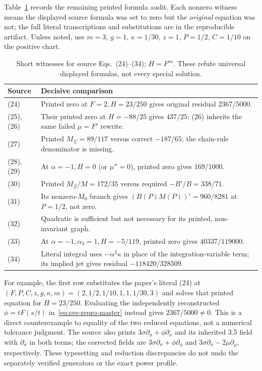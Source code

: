 Table~\ref{tab:sve-repro-source-errors} records the remaining printed
formula audit. Each nonzero witness means the displayed source formula was
set to zero but the \emph{original} equation was not; the full literal
transcriptions and substitutions are in the reproducible artifact. Unless
noted, use $m=3$, $g=1$, $\kappa=1/30$, $z=1$, $P=1/2$, $C=1/10$ on the
positive chart.
\begin{table}[ht]
\centering\small
\begin{tabularx}{\linewidth}{@{}p{1.35cm}X@{}}
\toprule
Source & Decisive comparison\\
\midrule
(24) & Printed zero at $F=2,H=23/250$ gives original residual $2367/5000$.\\
(25), (26) & Their printed zero at $H=-88/25$ gives $437/25$; (26) inherits the same failed $\mu=F'$ rewrite.\\
(27) & Printed $M_\Sigma=89/117$ versus correct $-187/65$; the chain-rule denominator is missing.\\
(28), (29) & At $\alpha=-1,H=0$ (or $\mu''=0$), printed zero gives $169/1000$.\\
(30) & Printed $M_\Xi/M=172/35$ versus required $-B'/B=338/71$.\\
(31) & Its nonzero-$M_0$ branch gives $(B(P)M(P))'=960/8281$ at $P=1/2$, not zero.\\
(32) & Quadratic is sufficient but not necessary for its printed, non-invariant graph.\\
(33) & At $\alpha=-1,\alpha_3=1,H=-5/119$, printed zero gives $40337/119000$.\\
(34) & Literal integral uses $-\alpha^2\kappa$ in place of the integration-variable term; its implied jet gives residual $-118420/328509$.\\
\bottomrule
\end{tabularx}
\caption{Short witnesses for source Eqs.~(24)--(34); $H=F'''$. These refute universal displayed formulas, not every special solution.}
\label{tab:sve-repro-source-errors}
\end{table}
For example, the first row substitutes the paper's literal (24) at
$(F,P,C,z,g,\kappa,m)=(2,1/2,1/10,1,1,1/30,3)$ and solves that
printed equation for $H=23/250$. Evaluating the independently reconstructed
$\phi=tF(s/t)$ in~\eqref{eq:sve-repro-master} instead gives
$2367/5000\ne0$. This is a direct counterexample to equality of the two
reduced equations, not a numerical tolerance judgment. The source also
prints $3\sigma\partial_\sigma+\phi\partial_\sigma$ and its inherited
3.5 field with $\partial_\sigma$ in both terms; the corrected fields are
$3\sigma\partial_\sigma+\phi\partial_\phi$ and
$3\sigma\partial_\sigma-2\mu\partial_\mu$, respectively.
These typesetting and reduction discrepancies do not undo the separately
verified generators or the exact power profile.


